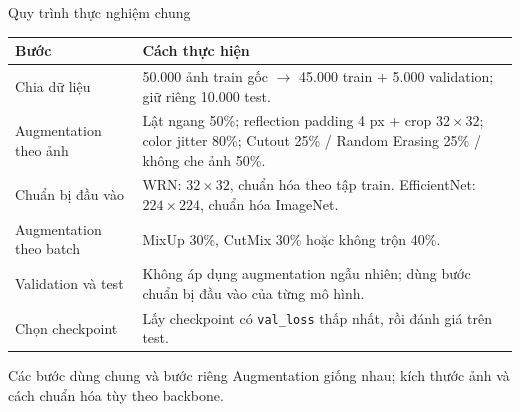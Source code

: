\documentclass[aspectratio=169,10pt]{beamer}
\begin{document}
\begin{frame}{Quy trình thực nghiệm chung}
  \small
  \begin{tabularx}{\linewidth}{@{}p{.20\linewidth}X@{}}
    \toprule
    Bước & Cách thực hiện \\
    \midrule
    Chia dữ liệu & 50.000 ảnh train gốc $\rightarrow$ 45.000 train + 5.000 validation; giữ riêng 10.000 test. \\
    Augmentation theo ảnh & Lật ngang 50\%; reflection padding 4 px + crop $32\times32$; color jitter 80\%; Cutout 25\% / Random Erasing 25\% / không che ảnh 50\%. \\
    Chuẩn bị đầu vào & WRN: $32\times32$, chuẩn hóa theo tập train. EfficientNet: $224\times224$, chuẩn hóa ImageNet. \\
    Augmentation theo batch & MixUp 30\%, CutMix 30\% hoặc không trộn 40\%. \\
    Validation và test & Không áp dụng augmentation ngẫu nhiên; dùng bước chuẩn bị đầu vào của từng mô hình. \\
    Chọn checkpoint & Lấy checkpoint có \texttt{val\_loss} thấp nhất, rồi đánh giá trên test. \\
    \bottomrule
  \end{tabularx}
  \vspace{0.5em}
  \begin{block}{Các bước dùng chung và bước riêng}
    Augmentation giống nhau; kích thước ảnh và cách chuẩn hóa tùy theo backbone.
  \end{block}
\end{frame}
\end{document}
